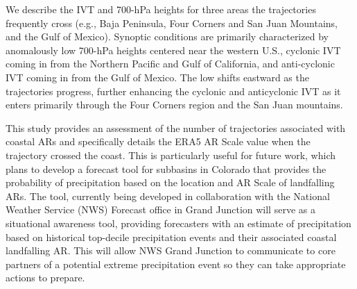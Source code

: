 \documentclass[draft]{agujournal2019}
\begin{document}
We describe the IVT and 700-hPa heights for three areas the trajectories frequently cross (e.g., Baja Peninsula, Four Corners and San Juan Mountains, and the Gulf of Mexico). Synoptic conditions are primarily characterized by anomalously low 700-hPa heights centered near the western U.S., cyclonic IVT coming in from the Northern Pacific and Gulf of California, and anti-cyclonic IVT coming in from the Gulf of Mexico. The low shifts eastward as the trajectories progress, further enhancing the cyclonic and anticyclonic IVT as it enters primarily through the Four Corners region and the San Juan mountains. 

This study provides an assessment of the number of trajectories associated with coastal ARs and specifically details the ERA5 AR Scale \cite{MartinRalph2019} value when the trajectory crossed the coast. This is particularly useful for future work, which plans to develop a forecast tool for subbasins in Colorado that provides the probability of precipitation based on the location and AR Scale of landfalling ARs. The tool, currently being developed in collaboration with the National Weather Service (NWS) Forecast office in Grand Junction will serve as a situational awareness tool, providing forecasters with an estimate of precipitation based on historical top-decile precipitation events and their associated coastal landfalling AR. This will allow NWS Grand Junction to communicate to core partners of a potential extreme precipitation event so they can take appropriate actions to prepare.







%
%
\end{document}
